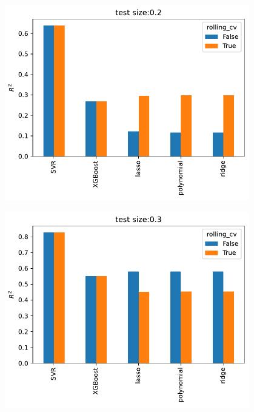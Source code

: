 \begin{figure}[H]
\begin{center}\includegraphics[width = 0.95\textwidth]{figures/output_43_1.pdf}\end{center}
\vspace{-0.7cm}
\caption{}
\label{fig:}
\end{figure}
\begin{figure}[H]
\begin{center}\includegraphics[width = 0.95\textwidth]{figures/output_43_2.pdf}\end{center}
\vspace{-0.7cm}
\caption{}
\label{fig:}
\end{figure}
